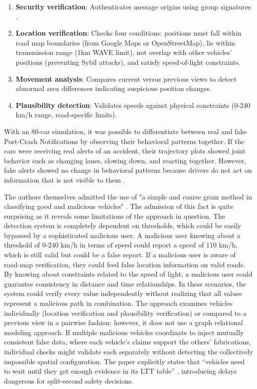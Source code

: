 \documentclass[12pt, a4paper]{report}
\begin{document}
\begin{enumerate}

	\item \textbf{Security verification}: Authenticates message origins using group signatures \cite{ghaleb2014}.
	\item \textbf{Location verification}: Checks four conditions: positions must fall within road map boundaries (from Google Maps or OpenStreetMap), lie within transmission range (1km WAVE limit), not overlap with other vehicles' positions (preventing Sybil attacks), and satisfy speed-of-light constraints\cite{ghaleb2014}.
	\item \textbf{Movement analysis}: Compares current versus previous views to detect abnormal area differences indicating suspicious position changes\cite{ghaleb2014}.
	\item \textbf{Plausibility detection}: Validates speeds against physical constraints (0-240 km/h range, road-specific limits)\cite{ghaleb2014}.
\end{enumerate}

With an 80-car simulation, it was possible to differentiate between real and fake Post-Crash Notifications by observing their behavioral patterns together. If the cars were receiving real alerts of an accident, their trajectory plots showed joint behavior such as changing lanes, slowing down, and reacting together. However, fake alerts showed no change in behavioral patterns because drivers do not act on information that is not visible to them \cite{ghaleb2014}.

The authors themselves admitted the use of "a simple and coarse grain method in classifying good and malicious vehicles" \cite{ghaleb2014}. The admission of this fact is quite surprising as it reveals some limitations of the approach in question. The detection system is completely dependent on thresholds, which could be easily bypassed by a sophisticated malicious user. A malicious user knowing about a threshold of 0-240 km/h in terms of speed could report a speed of 110 km/h, which is still valid but could be a false report. If a malicious user is aware of road-map verification, they could feed false location information on valid roads. By knowing about constraints related to the speed of light, a malicious user could guarantee consistency in distance and time relationships. In these scenarios, the system could verify every value independently without realizing that all values represent a malicious path in combination. The approach examines vehicles individually (location verification and plausibility verification) or compared to a previous view in a pairwise fashion; however, it does not use a graph relational modeling approach. If multiple malicious vehicles coordinate to inject mutually consistent false data, where each vehicle's claims support the others' fabrications, individual checks might validate each separately without detecting the collectively impossible spatial configuration. The paper explicitly states that ``vehicles need to wait until they get enough evidence in its LTT table'' \cite{ghaleb2014}, introducing delays dangerous for split-second safety decisions.
\end{document}
